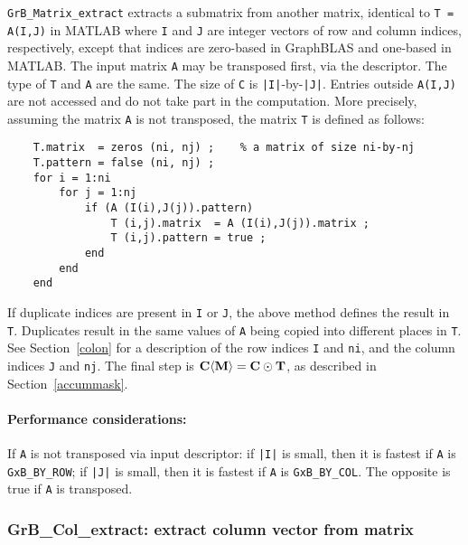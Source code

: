 \documentclass[12pt]{article}
\begin{document}
\verb'GrB_Matrix_extract' extracts a submatrix from another matrix, identical
to \verb'T = A(I,J)' in MATLAB where \verb'I' and \verb'J' are integer vectors
of row and column indices, respectively, except that indices are zero-based in
GraphBLAS and one-based in MATLAB.  The input matrix \verb'A' may be transposed
first, via the descriptor.  The type of \verb'T' and \verb'A' are the same.
The size of \verb'C' is \verb'|I|'-by-\verb'|J|'.
Entries outside \verb'A(I,J)' are not accessed and do not take part in the
computation.  More precisely, assuming the matrix \verb'A' is not transposed,
the matrix \verb'T' is defined as follows:

    \vspace{-0.1in}
    {\footnotesize
    \begin{verbatim}
    T.matrix  = zeros (ni, nj) ;    % a matrix of size ni-by-nj
    T.pattern = false (ni, nj) ;
    for i = 1:ni
        for j = 1:nj
            if (A (I(i),J(j)).pattern)
                T (i,j).matrix  = A (I(i),J(j)).matrix ;
                T (i,j).pattern = true ;
            end
        end
    end \end{verbatim}}

\vspace{-0.1in}
If duplicate indices are present in \verb'I' or \verb'J', the above method
defines the result in \verb'T'.  Duplicates result in the same values of
\verb'A' being copied into different places in \verb'T'.
See Section~\ref{colon} for a description of the row indices
\verb'I' and \verb'ni', and the column indices
\verb'J' and \verb'nj'.
The final step is ${\bf C \langle M \rangle  = C \odot
T}$, as described in Section~\ref{accummask}.

\paragraph{\bf Performance considerations:} %
If \verb'A' is not transposed via input descriptor: if \verb'|I|' is small,
then it is fastest if \verb'A' is \verb'GxB_BY_ROW'; if
\verb'|J|' is small, then it is fastest if \verb'A' is
\verb'GxB_BY_COL'.  The opposite is true if \verb'A' is transposed.

\newpage
\subsubsection{{\sf GrB\_Col\_extract:} extract column vector from matrix}
\label{extract_column}
\end{document}
